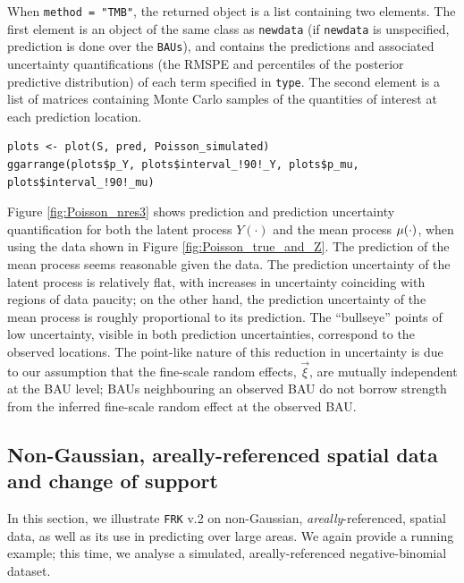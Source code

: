 \documentclass[12pt,a4paper]{article}
\begin{document}
When \texttt{method = "TMB"}, the returned object is a list containing two elements. 
The first element is an object of the same class as \texttt{newdata} (if \texttt{newdata} is unspecified, prediction is done over the \texttt{BAUs}), and contains the predictions and associated uncertainty quantifications (the RMSPE and percentiles of the posterior predictive distribution) of each term specified in \texttt{type}.
The second element is a list of matrices containing Monte Carlo samples of the quantities of interest at each prediction location. 

\begin{minipage}{\linewidth}
\begin{lstlisting}[style=R]
plots <- plot(S, pred, Poisson_simulated)
ggarrange(plots$p_Y, plots$interval_!90!_Y, plots$p_mu, plots$interval_!90!_mu)
\end{lstlisting}
\end{minipage}

Figure \ref{fig:Poisson_nres3} shows prediction and prediction uncertainty quantification for both the latent process $Y(\cdot)$ and the mean process $\mu(\cdot)$, when using the data shown in Figure \ref{fig:Poisson_true_and_Z}. 
The prediction of the mean process seems reasonable given the data. 
The prediction uncertainty of the latent process is relatively flat, with increases in uncertainty coinciding with regions of data paucity; on the other hand, the prediction uncertainty of the mean process is roughly proportional to its prediction. %
The  ``bullseye'' points of low uncertainty, visible in both prediction uncertainties, correspond to the observed locations. 
The point-like nature of this reduction in uncertainty is due to our assumption that the fine-scale random effects, $\vec{\xi}$, are mutually independent at the BAU level; BAUs neighbouring an observed BAU do not borrow strength from the inferred fine-scale random effect at the observed BAU.


\subsection{Non-Gaussian, areally-referenced spatial data and change of support}\label{sec:03-03:negative-binomial}




In this section, we illustrate \texttt{FRK} v.2 on non-Gaussian, \textit{areally}-referenced, spatial data, as well as its use in predicting over large areas. 
We again provide a running example; this time, we analyse a simulated, areally-referenced negative-binomial dataset.
\end{document}
